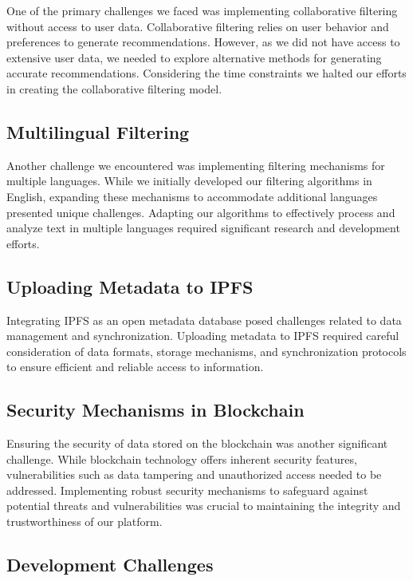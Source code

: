 \documentclass{article}
\begin{document}
One of the primary challenges we faced was implementing collaborative filtering without access to user data. Collaborative filtering relies on user behavior and preferences to generate recommendations. However, as we did not have access to extensive user data, we needed to explore alternative methods for generating accurate recommendations. Considering the time constraints we halted our efforts in creating the collaborative filtering model.

\subsection{Multilingual Filtering}

Another challenge we encountered was implementing filtering mechanisms for multiple languages. While we initially developed our filtering algorithms in English, expanding these mechanisms to accommodate additional languages presented unique challenges. Adapting our algorithms to effectively process and analyze text in multiple languages required significant research and development efforts.

\subsection{Uploading Metadata to IPFS}

Integrating IPFS as an open metadata database posed challenges related to data management and synchronization. Uploading metadata to IPFS required careful consideration of data formats, storage mechanisms, and synchronization protocols to ensure efficient and reliable access to information.

\subsection{Security Mechanisms in Blockchain}

Ensuring the security of data stored on the blockchain was another significant challenge. While blockchain technology offers inherent security features, vulnerabilities such as data tampering and unauthorized access needed to be addressed. Implementing robust security mechanisms to safeguard against potential threats and vulnerabilities was crucial to maintaining the integrity and trustworthiness of our platform.

\subsection{Development Challenges}
\end{document}
